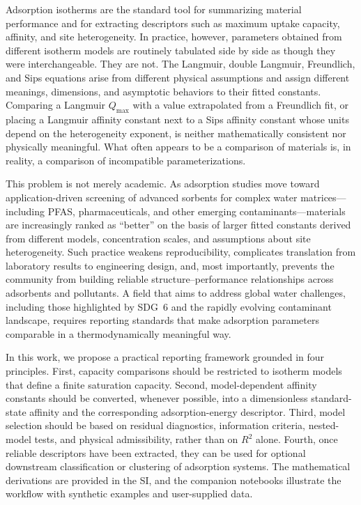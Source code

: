 \documentclass[journal=jacsat,manuscript=article]{achemso}
\begin{document}
	Adsorption isotherms are the standard tool for summarizing material performance and for extracting descriptors such as maximum uptake capacity, affinity, and site heterogeneity. In practice, however, parameters obtained from different isotherm models are routinely tabulated side by side as though they were interchangeable. They are not. The Langmuir, double Langmuir, Freundlich, and Sips equations arise from different physical assumptions and assign different meanings, dimensions, and asymptotic behaviors to their fitted constants.\cite{langmuir_adsorption_1918,freundlich_uber_1907,sips_structure_1948} Comparing a Langmuir $Q_\mathrm{max}$ with a value extrapolated from a Freundlich fit, or placing a Langmuir affinity constant next to a Sips affinity constant whose units depend on the heterogeneity exponent, is neither mathematically consistent nor physically meaningful.\cite{latour_langmuir_2015,de_vargas_briao_sips_2023} What often appears to be a comparison of materials is, in reality, a comparison of incompatible parameterizations.\cite{foo_insights_2010}

	This problem is not merely academic. As adsorption studies move toward application-driven screening of advanced sorbents for complex water matrices---including PFAS, pharmaceuticals, and other emerging contaminants---materials are increasingly ranked as ``better'' on the basis of larger fitted constants derived from different models, concentration scales, and assumptions about site heterogeneity. Such practice weakens reproducibility, complicates translation from laboratory results to engineering design, and, most importantly, prevents the community from building reliable structure--performance relationships across adsorbents and pollutants. A field that aims to address global water challenges, including those highlighted by SDG~6 and the rapidly evolving contaminant landscape, requires reporting standards that make adsorption parameters comparable in a thermodynamically meaningful way.
	

	In this work, we propose a practical reporting framework grounded in four
principles. First, capacity comparisons should be restricted to isotherm
models that define a finite saturation capacity. Second, model-dependent
affinity constants should be converted, whenever possible, into a
dimensionless standard-state affinity and the corresponding adsorption-energy
descriptor. Third, model selection should be based on residual diagnostics,
information criteria, nested-model tests, and physical admissibility, rather
than on $R^2$ alone. Fourth, once reliable descriptors have been extracted,
they can be used for optional downstream classification or clustering of
adsorption systems. The mathematical derivations are provided in the SI, and
the companion notebooks illustrate the workflow with synthetic examples and
user-supplied data.
	
\end{document}
